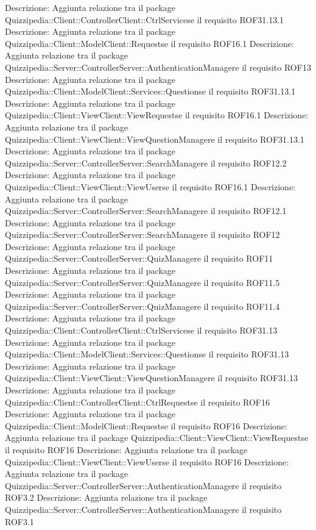 Descrizione: Aggiunta relazione tra il package Quizzipedia::Client::ControllerClient::CtrlServicese il requisito ROF31.13.1 
Descrizione: Aggiunta relazione tra il package Quizzipedia::Client::ModelClient::Requestse il requisito ROF16.1 
Descrizione: Aggiunta relazione tra il package Quizzipedia::Server::ControllerServer::AuthenticationManagere il requisito ROF13 
Descrizione: Aggiunta relazione tra il package Quizzipedia::Client::ModelClient::Services::Questionse il requisito ROF31.13.1 
Descrizione: Aggiunta relazione tra il package Quizzipedia::Client::ViewClient::ViewRequestse il requisito ROF16.1 
Descrizione: Aggiunta relazione tra il package Quizzipedia::Client::ViewClient::ViewQuestionManagere il requisito ROF31.13.1 
Descrizione: Aggiunta relazione tra il package Quizzipedia::Server::ControllerServer::SearchManagere il requisito ROF12.2 
Descrizione: Aggiunta relazione tra il package Quizzipedia::Client::ViewClient::ViewUserse il requisito ROF16.1 
Descrizione: Aggiunta relazione tra il package Quizzipedia::Server::ControllerServer::SearchManagere il requisito ROF12.1 
Descrizione: Aggiunta relazione tra il package Quizzipedia::Server::ControllerServer::SearchManagere il requisito ROF12 
Descrizione: Aggiunta relazione tra il package Quizzipedia::Server::ControllerServer::QuizManagere il requisito ROF11 
Descrizione: Aggiunta relazione tra il package Quizzipedia::Server::ControllerServer::QuizManagere il requisito ROF11.5 
Descrizione: Aggiunta relazione tra il package Quizzipedia::Server::ControllerServer::QuizManagere il requisito ROF11.4 
Descrizione: Aggiunta relazione tra il package Quizzipedia::Client::ControllerClient::CtrlServicese il requisito ROF31.13 
Descrizione: Aggiunta relazione tra il package Quizzipedia::Client::ModelClient::Services::Questionse il requisito ROF31.13 
Descrizione: Aggiunta relazione tra il package Quizzipedia::Client::ViewClient::ViewQuestionManagere il requisito ROF31.13 
Descrizione: Aggiunta relazione tra il package Quizzipedia::Client::ControllerClient::CtrlRequestse il requisito ROF16 
Descrizione: Aggiunta relazione tra il package Quizzipedia::Client::ModelClient::Requestse il requisito ROF16 
Descrizione: Aggiunta relazione tra il package Quizzipedia::Client::ViewClient::ViewRequestse il requisito ROF16 
Descrizione: Aggiunta relazione tra il package Quizzipedia::Client::ViewClient::ViewUserse il requisito ROF16 
Descrizione: Aggiunta relazione tra il package Quizzipedia::Server::ControllerServer::AuthenticationManagere il requisito ROF3.2 
Descrizione: Aggiunta relazione tra il package Quizzipedia::Server::ControllerServer::AuthenticationManagere il requisito ROF3.1 
